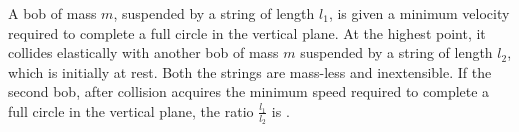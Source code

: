 

    \item A bob of mass \( m \), suspended by a string of length \( l_1 \), is given a minimum velocity 
    required to complete a full circle in the vertical plane. At the highest point, it collides 
    elastically with another bob of mass \( m \) suspended by a string of length \( l_2 \), which is 
    initially at rest. Both the strings are mass-less and inextensible. If the second bob, 
    after collision acquires the minimum speed required to complete a full circle in the 
    vertical plane, the ratio \( \frac{l_1}{l_2} \) is \underline{\hspace{2.5 cm}}.

